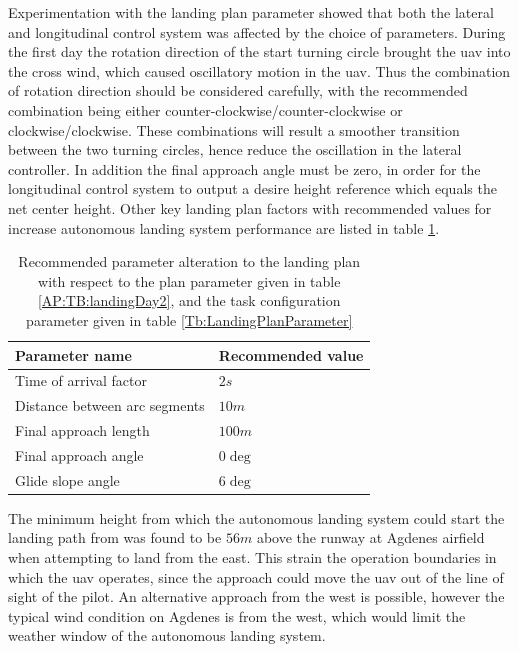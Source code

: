 Experimentation with the landing plan parameter showed that both the lateral and longitudinal control system was affected by the choice of parameters. During the first day the rotation direction of the start turning circle brought the \gls{uav} into the cross wind, which caused oscillatory motion in the \gls{uav}. Thus the combination of rotation direction should be considered carefully, with the recommended combination being either counter-clockwise/counter-clockwise or clockwise/clockwise. These combinations will result a smoother transition between the two turning circles, hence reduce the oscillation in the lateral controller. In addition the final approach angle must be zero, in order for the longitudinal control system to output a desire height reference which equals the net center height. Other key landing plan factors with recommended values for increase autonomous landing system performance are listed in table \ref{Tb:RecommmendedLandingPlanParameter}.
\begin{table}[H]
\centering
\begin{tabular}{| l | l |}
\hline
\textbf{Parameter name}			&  \textbf{Recommended value} 	\\ \hline
Time of arrival factor			&	$2 s$						\\ \hline
Distance between arc segments	&	$10 m$					 	\\ \hline
Final approach length			&	$100 m$					 	\\ \hline
Final approach angle			&   $0 \deg$					\\ \hline
Glide slope angle				&	$6 \deg$				 	\\ \hline
\end{tabular}
\caption{Recommended parameter alteration to the landing plan with respect to the plan parameter given in table \ref{AP:TB:landingDay2}, and the task configuration parameter given in table \ref{Tb:LandingPlanParameter}}
\label{Tb:RecommmendedLandingPlanParameter}
\end{table}
The minimum height from which the autonomous landing system could start the landing path from was found to be $56 m$ above the runway at Agdenes airfield when attempting to land from the east. This strain the operation boundaries in which the \gls{uav} operates, since the approach could move the \gls{uav} out of the line of sight of the pilot. An alternative approach from the west is possible, however the typical wind condition on Agdenes is from the west, which would limit the weather window of the autonomous landing system.
